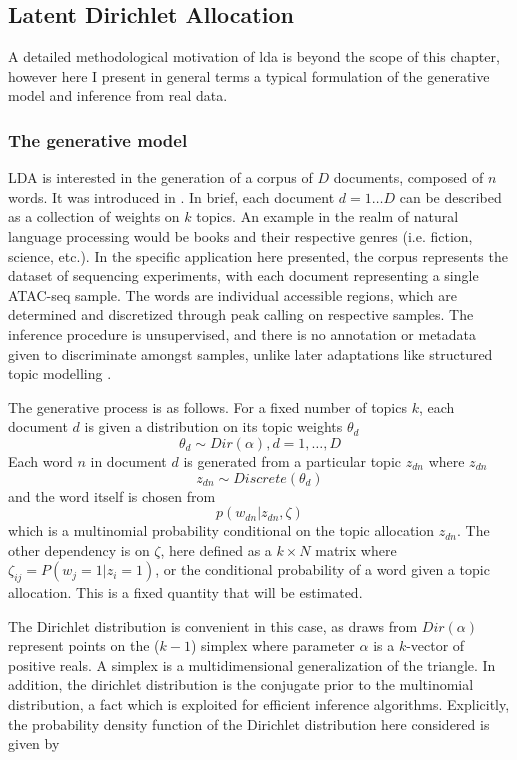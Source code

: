 \subsection{Latent Dirichlet Allocation}

A detailed methodological motivation of \gls{lda} is beyond the scope of this chapter, however here I present in general terms a typical formulation of the generative model and inference from real data.  

\subsubsection{The generative model}

LDA is interested in the generation of a corpus of $D$ documents, composed of $n$ words. It was introduced in \textcite{Blei2003}. In brief, each document $d = 1 \ldots D$ can be described as a collection of weights on $k$ topics. An example in the realm of natural language processing would be books and their respective genres (i.e. fiction, science, etc.). In the specific application here presented, the corpus represents the dataset of sequencing experiments, with each document representing a single ATAC-seq sample. The words are individual accessible regions, which are determined and discretized through peak calling on respective samples. The inference procedure is unsupervised, and there is no annotation or metadata given to discriminate amongst samples, unlike later adaptations like structured topic modelling \cite{Roberts2019}.

The generative process is as follows. For a fixed number of topics $k$, each document $d$ is given a distribution on its topic weights $\theta_d$ $$ \theta_d \sim Dir(\alpha), d = 1, \ldots, D $$ Each word $n$ in document $d$ is generated from a particular topic $z_{dn}$ where  $z_{dn}$ $$ z_{dn} \sim Discrete(\theta_d) $$ and the word itself is chosen from $$ p(w_{dn} | z_{dn}, \zeta) $$ which is a multinomial probability conditional on the topic allocation $z_{dn}$. The other dependency is on $\zeta$, here defined as a $k \times N$ matrix where $\zeta_{ij} = P(w_j =1 | z_i = 1)$, or the conditional probability of a word given a topic allocation. This is a fixed quantity that will be estimated. 

The Dirichlet distribution is convenient in this case, as draws from $Dir(\alpha)$ represent points on the ($k-1$) simplex where parameter $\alpha$ is a $k$-vector of positive reals. A simplex is a multidimensional generalization of the triangle. In addition, the dirichlet distribution is the conjugate prior to the multinomial distribution, a fact which is exploited for efficient inference algorithms. Explicitly, the probability density function of the Dirichlet distribution here considered is given by 

